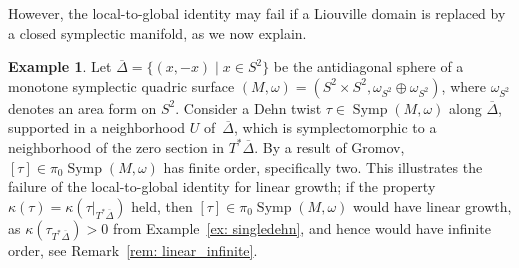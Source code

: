 \documentclass[12pt]{article}
\theoremstyle{theorem}
\theoremstyle{definition}
\newtheorem{example}[theorem]{Example}
\theoremstyle{remark}
\numberwithin{equation}{section}
\newcommand{\ow}{\omega}
\DeclareMathOperator{\Symp}{Symp}
\begin{document}
However, the local-to-global identity may fail if a Liouville domain is replaced by a closed symplectic manifold, as we now explain.

\begin{example}\label{ex: failure}
Let $\overline{\Delta}=\{(x,-x)\mid x\in S^2\}$ be the antidiagonal sphere of a monotone symplectic quadric surface $(M,\ow)=(S^2\times S^2,\ow_{S^2}\oplus\ow_{S^2})$, where $\ow_{S^2}$ denotes an area form on $S^2$.
Consider a Dehn twist $\tau\in \Symp(M,\ow)$ along $\overline{\Delta}$, supported in a neighborhood $U$ of~$\overline{\Delta}$, which is symplectomorphic to a neighborhood of the zero section in $T^*\overline{\Delta}$.
By a result of Gromov, $[\tau]\in \pi_0 \Symp(M,\ow)$ has finite order, specifically two.
This illustrates the failure of the local-to-global identity for linear growth; if the property  $\kappa(\tau)=\kappa(\tau|_{T^*\overline{\Delta}})$ held, then $[\tau]\in \pi_0\Symp(M,\ow)$ would have linear growth, as $\kappa(\tau_{T^*\overline{\Delta}})>0$ from Example~\ref{ex: singledehn}, and hence would have infinite order, see Remark~\ref{rem: linear_infinite}.
\end{example}
\end{document}
